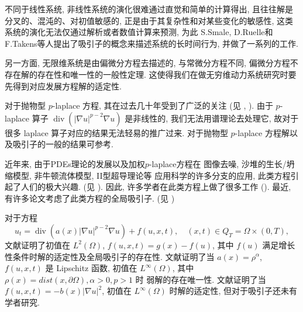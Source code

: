\documentclass[twoside,longtitle]{LZUthesis}
\theoremstyle{definition}
\numberwithin{equation}{chapter}
\newcommand*\abs[1]{\lvert#1\rvert}
\DeclareMathOperator{\Div}{div}
\begin{document}
不同于线性系统, 非线性系统的演化很难通过直觉和简单的计算得出, 
且往往解是分叉的、混沌的、对初值敏感的, 
正是由于其复杂性和对某些变化的敏感性, 这类系统的演化无法仅通过解析或者数值计算来预测, 
为此 S.Smale, D.Ruelle和F.Takens等人提出了吸引子的概念来描述系统的长时间行为, 
并做了一系列的工作. 

另一方面, 无限维系统是由偏微分方程去描述的, 与常微分方程不同, 偏微分方程不存在解的存在性和唯一性的一般性定理. 
这使得我们在做无穷维动力系统研究时要先得到对应发展方程解的适定性. 

对于抛物型 $p$-laplace 方程, 其在过去几十年受到了广泛的关注
(见 \citep{liuAsymptoticRegularityPLaplacian2010,zhongZ2IndexGlobal2010,acerbiRegularityResultsStationary2002,rajagopalMathematicalModelingElectrorheological2001,aboulaichNewDiffusionModels2008,guoSingularPhenomenaSolutions2015,antontsevUniquenessComparisonTheorems2013,gaoExistenceUniquenessNonexistence2016,liuNonlinearDiffusionProblem2019,guoStudyWeakSolutions2011,antontsevParabolicEquationsAnisotropic2007,constantinGlobalExistenceFully2006,constantinGlobalSolutionsQuasilinear2002},
). 由于 $p$-laplace 算子 $\Div(\abs{\nabla u}^{p-2}\nabla u)$ 是非线性的, 我们无法用谱理论去处理它, 故对于很多 laplace 算子对应的结果无法轻易的推广过来. 
对于抛物型 $p$-laplace 方程解以及吸引子的一般的结果可参考\citep{efendievAttractorsDegenerateParabolic2013b}.

近年来, 由于PDEs理论的发展以及加权$p$-laplace方程在
图像去噪, 沙堆的生长/坍缩模型, 非牛顿流体模型, II型超导理论等
应用科学的许多分支的应用, 此类方程引起了人们的极大兴趣. 
(见 \citep{aronssonFastSlowDiffusion1996,aubertMathematicalProblemsImage2006,mastorakisSolutionPLaplacianNonNewtonian2009,yinLaplacianTypeEvolution2001}).
因此, 许多学者在此类方程上做了很多工作
(\citep{cortazarExistenceSignChanging2014,musinaExistenceMultiplicityResults2009,gazziniSobolevtypeInequalityRelated2009,liLongtimeBehaviorClass2014b,maGlobalAttractorsWeighted2012a,cavalheiroWeightedSobolevSpaces2008,caldiroliVariationalDegenerateElliptic2000,leBoundaryValueProblems1998,monticelliMaximumPrinciplesWeak2009,dibenedettoDegenerateSingularParabolic1993,galClassDegenerateParabolic2012,yinEvolutionaryWeightedPLaplacian2007,Zhan2019Uniquenessa}).
最近, 有许多论文考虑了此类方程的全局吸引子. 
(见 \citep{anhGlobalExistenceLongtime2008,anhGlobalAttractorMsemiflow2010,anhLongtimeBehaviorQuasilinear2009,karachaliosConvergenceAttractorsDegenerate2005,karachaliosDynamicsDegenerateParabolic2006,karachaliosGlobalAttractorsConvergence2005})

对于方程
\begin{equation}
	u_t = \Div(a(x)\abs{\nabla u}^{p-2}\nabla u) + f(u, x, t), \quad (x, t) \in Q_T = \Omega \times (0, T),
\end{equation}
文献\citep{maGlobalAttractorsWeighted2012a}证明了初值在 $L^2(\Omega)$, $f(u, x, t) = g(x) - f(u)$, 其中 $f(u)$ 满足增长性条件时解的适定性及全局吸引子的存在性. 
文献\citep{zhanParabolicEquationRelated2016}证明了当
$a(x) = \rho^\alpha$, $f(u, x, t)$ 是 Lipschitz 函数, 初值在 $L^\infty(\Omega)$, 其中 $\rho(x) = dist(x, \partial \Omega), \alpha > 0, p > 1$ 时
弱解的存在唯一性. 文献\citep{Zhan2019Uniquenessa}证明了当 $f(u, x, t) = -b(x)\abs{\nabla u}^2$, 初值在 $L^\infty(\Omega)$ 时解的适定性, 但对于吸引子还未有学者研究. 
\end{document}
